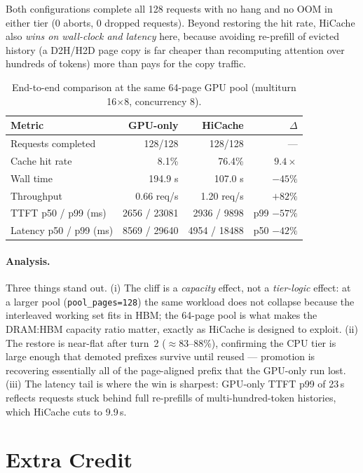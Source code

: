 \documentclass[11pt]{article}
\begin{document}
Both configurations complete all 128 requests with no hang and no OOM in either tier (0 aborts, 0 dropped requests). Beyond restoring the hit rate, HiCache also \emph{wins on wall-clock and latency} here, because avoiding re-prefill of evicted history (a D2H/H2D page copy is far cheaper than recomputing attention over hundreds of tokens) more than pays for the copy traffic.

\begin{table}[htbp]
  \centering
  \caption{End-to-end comparison at the same 64-page GPU pool (multiturn 16$\times$8, concurrency 8).}
  \label{tab:e2e}
  \begin{tabular}{@{}lrrr@{}}
    \toprule
    Metric & GPU-only & HiCache & $\Delta$ \\
    \midrule
    Requests completed & 128/128 & 128/128 & --- \\
    Cache hit rate     & 8.1\%   & 76.4\%  & $9.4\times$ \\
    Wall time          & 194.9 s & 107.0 s & $-45\%$ \\
    Throughput         & 0.66 req/s & 1.20 req/s & $+82\%$ \\
    TTFT p50 / p99 (ms)& 2656 / 23081 & 2936 / 9898 & p99 $-57\%$ \\
    Latency p50 / p99 (ms)& 8569 / 29640 & 4954 / 18488 & p50 $-42\%$ \\
    \bottomrule
  \end{tabular}
\end{table}

\paragraph{Analysis.}
Three things stand out. (i) The cliff is a \emph{capacity} effect, not a \emph{tier-logic} effect: at a larger pool (\texttt{pool\_pages=128}) the same workload does not collapse because the interleaved working set fits in HBM; the 64-page pool is what makes the DRAM:HBM capacity ratio matter, exactly as HiCache is designed to exploit. (ii) The restore is near-flat after turn~2 ($\approx$83--88\%), confirming the CPU tier is large enough that demoted prefixes survive until reused --- promotion is recovering essentially all of the page-aligned prefix that the GPU-only run lost. (iii) The latency tail is where the win is sharpest: GPU-only TTFT p99 of 23\,s reflects requests stuck behind full re-prefills of multi-hundred-token histories, which HiCache cuts to 9.9\,s.

\section{Extra Credit}
\end{document}
